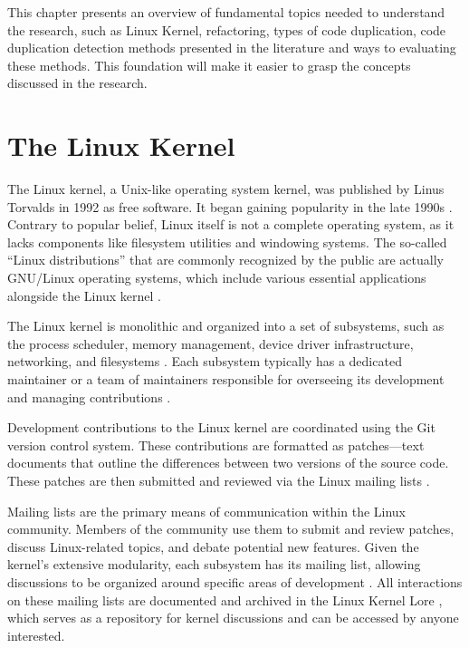 \en

This chapter presents an overview of fundamental topics needed to understand 
the research, such as Linux Kernel, refactoring, types of code duplication, 
code duplication detection methods presented in the literature and ways to 
evaluating these methods. This foundation will make it easier to grasp the 
concepts discussed in the research.

\section{The Linux Kernel}

The Linux kernel, a Unix-like operating system kernel, was published by Linus
Torvalds in 1992 as free software. It began gaining popularity in the late
1990s \citep{linuxbook}. Contrary to popular belief, Linux itself is not a
complete operating system, as it lacks components like filesystem utilities and
windowing systems. The so-called ``Linux distributions'' that are commonly
recognized by the public are actually GNU/Linux operating systems, which
include various essential applications alongside the Linux kernel
\citep{gnuref}.

The Linux kernel is monolithic and organized into a set of subsystems, such as
the process scheduler, memory management, device driver infrastructure,
networking, and filesystems \citep{melissa}. Each subsystem typically has a
dedicated maintainer or a team of maintainers responsible for overseeing its
development and managing contributions \citep{melissa}.

Development contributions to the Linux kernel are coordinated using the Git
version control system. These contributions are formatted as patches—text
documents that outline the differences between two versions of the source code.
These patches are then submitted and reviewed via the Linux mailing lists
\citep{melissa}.

Mailing lists are the primary means of communication within the Linux
community. Members of the community use them to submit and review patches,
discuss Linux-related topics, and debate potential new features. Given the
kernel's extensive modularity, each subsystem has its mailing list, allowing
discussions to be organized around specific areas of development
\citep{melissa}. All interactions on these mailing lists are documented and
archived in the Linux Kernel Lore \citep{linuxlore}, which serves as a
repository for kernel discussions and can be accessed by anyone interested.

